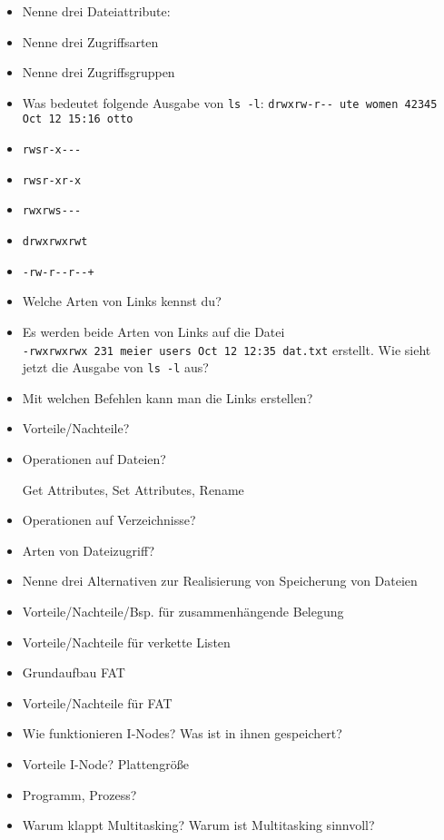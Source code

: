\documentclass[10pt,a4paper]{article}
\begin{document}
\begin{itemize}
\item Nenne drei Dateiattribute:

\item Nenne drei Zugriffsarten

\item Nenne drei Zugriffsgruppen

\item Was bedeutet folgende Ausgabe von \verb_ls -l_: \verb_drwxrw-r-- ute women 42345 Oct 12 15:16 otto_

\item \verb_rwsr-x---_
\item \verb_rwsr-xr-x_
\item \verb_rwxrws---_
\item \verb_drwxrwxrwt_
\item \verb_-rw-r--r--+_
\item Welche Arten von Links kennst du?

\item Es werden beide Arten von Links auf die Datei\\ \verb_-rwxrwxrwx 231 meier users Oct 12 12:35 dat.txt_ erstellt. Wie sieht jetzt die Ausgabe von \verb_ls -l_ aus?

\item Mit welchen Befehlen kann man die Links erstellen?

\item Vorteile/Nachteile?
\item Operationen auf Dateien?

Get Attributes, Set Attributes, Rename
\item Operationen auf Verzeichnisse?
\item Arten von Dateizugriff?

\item Nenne drei Alternativen zur Realisierung von Speicherung von Dateien

\item Vorteile/Nachteile/Bsp. für zusammenhängende Belegung
\item Vorteile/Nachteile für verkette Listen
\item Grundaufbau FAT
\item Vorteile/Nachteile für FAT
\item Wie funktionieren I-Nodes? Was ist in ihnen gespeichert?
\item Vorteile I-Node? Plattengröße 
\item Programm, Prozess?
\item Warum klappt Multitasking? Warum ist Multitasking sinnvoll?
\end{itemize}
\end{document}
